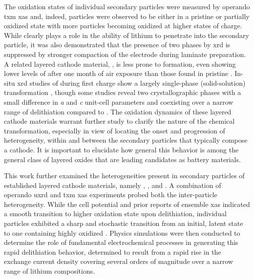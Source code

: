 \documentclass{article}
\begin{document}
The oxidation states of individual secondary particles were measured
by operando \gls{txm} \gls{xas} and, indeed, particles were observed
to be either in a pristine or partially oxidized state with more
particles becoming oxidized at higher states of
charge\cite{nowack2016}. While  clearly plays a role in the
ability of lithium to penetrate into the secondary particle, it was
also demonstrated that the presence of two phases by \gls{xrd} is
suppressed by stronger compaction of the electrode during laminate
preparation\cite{bobrikov2018}. A related layered cathode material,
\nmc[333]{}, is less prone to  formation, even showing
lower levels of  after one month of air exposure than those
found in pristine \nca{}\cite{shizuka2007}. In-situ \gls{xrd} studies
of \nmc[333]{} during first charge show a largely single-phase
(solid-solution) transformation \cite{hulzen2018,ahn2017,zhou2016-2},
though some studies reveal two crystallographic phases with a small
difference in \emph{a} and \emph{c} unit-cell parameters and
coexisting over a narrow range of delithiation compared to
\nca{}\cite{yoon2006,hua2018}. The oxidation dynamics of these layered
cathode materials warrant further study to clarify the nature of the
chemical transformation, especially in view of locating the onset and
progression of heterogeneity, within and between the secondary
particles that typically compose a cathode. It is important to
elucidate how general this behavior is among the general class of
layered oxides that are leading candidates as battery materials.

This work further examined the heterogeneities present in secondary
particles of established layered cathode materials, namely \nca{},
\nmc[333]{}, and \nmc[532]{}. A combination of operando \gls{uxrd} and
\gls{txm} \gls{xas} experiments probed both the inter-particle
heterogeneity. While the cell potential and prior reports of ensemble
\gls{xas} indicated a smooth transition to higher oxidation state upon
delithiation\cite{deb2005,muto2009}, individual particles exhibited a
sharp and stochastic transition from an initial, latent state to one
containing highly oxidized . Physics simulations were then
conducted to determine the role of fundamental electrochemical
processes in generating this rapid delithiation behavior, determined
to result from a rapid rise in the exchange current density covering
several orders of magnitude over a narrow range of lithium
compositions.

\end{document}
